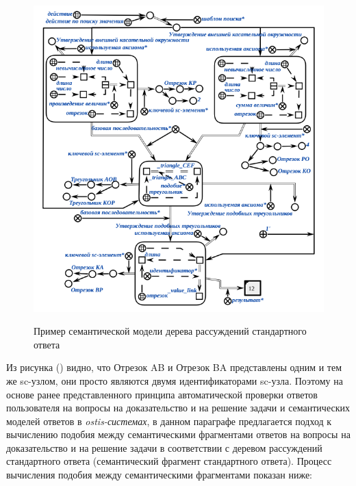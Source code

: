 \begin{figure}[H]
	\caption{Пример семантической модели дерева рассуждений стандартного ответа}
	\includegraphics[scale=0.6]{author/part7/figures/inference_tree_example_SCg.png}
	\label{fig:ITE_example}
\end{figure}

Из рисунка (\textit{}) видно, что Отрезок AB и Отрезок BA представлены одним и тем же sc-узлом, они просто являются двумя идентификаторами sc-узла. Поэтому на основе ранее представленного принципа автоматической проверки ответов пользователя на вопросы на доказательство и на решение задачи и семантических моделей ответов в \textit{ostis-системах}, в данном параграфе предлагается подход к вычислению подобия между семантическими фрагментами ответов на вопросы на доказательство и на решение задачи в соответствии с деревом рассуждений стандартного ответа (семантический фрагмент стандартного ответа). Процесс вычисления подобия между семантическими фрагментами показан ниже:

